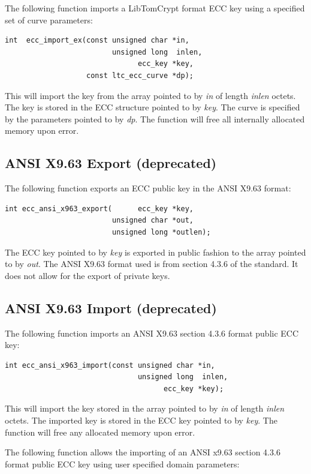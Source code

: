 \documentclass[synpaper]{book}
\begin{document}
The following function imports a LibTomCrypt format ECC key using a specified set of curve parameters:
\begin{verbatim}
int  ecc_import_ex(const unsigned char *in,
                         unsigned long  inlen,
                               ecc_key *key,
                   const ltc_ecc_curve *dp);
\end{verbatim}
This will import the key from the array pointed to by \textit{in} of length \textit{inlen} octets.  The key is stored in
the ECC structure pointed to by \textit{key}.  The curve is specified by the parameters pointed to by \textit{dp}.  The function will free
all internally allocated memory upon error.

\subsection{ANSI X9.63 Export (deprecated)}
The following function exports an ECC public key in the ANSI X9.63 format:

\begin{verbatim}
int ecc_ansi_x963_export(      ecc_key *key,
                         unsigned char *out,
                         unsigned long *outlen);
\end{verbatim}
The ECC key pointed to by \textit{key} is exported in public fashion to the array pointed to by \textit{out}.  The ANSI X9.63 format used is from
section 4.3.6 of the standard.  It does not allow for the export of private keys.

\subsection{ANSI X9.63 Import (deprecated)}

The following function imports an ANSI X9.63 section 4.3.6 format public ECC key:

\begin{verbatim}
int ecc_ansi_x963_import(const unsigned char *in,
                               unsigned long  inlen,
                                     ecc_key *key);
\end{verbatim}
This will import the key stored in the array pointed to by \textit{in} of length \textit{inlen} octets.  The imported key is stored in the ECC key pointed to by
\textit{key}.  The function will free any allocated memory upon error.

The following function allows the importing of an ANSI x9.63 section 4.3.6 format public ECC key using user specified domain parameters:
\end{document}
